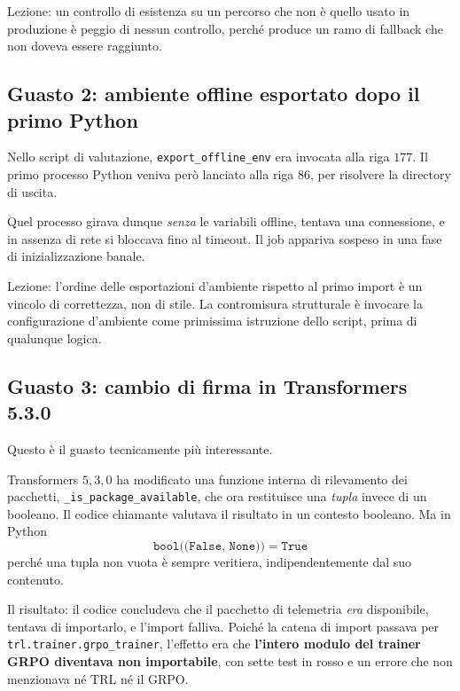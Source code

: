 Lezione: un controllo di esistenza su un percorso che non è quello usato in
produzione è peggio di nessun controllo, perché produce un ramo di fallback che
non doveva essere raggiunto.

\subsection{Guasto 2: ambiente offline esportato dopo il primo Python}
\label{sec:bug-offline-order}

Nello script di valutazione, \texttt{export\_offline\_env} era invocata alla riga
$177$. Il primo processo Python veniva però lanciato alla riga $86$, per
risolvere la directory di uscita.

Quel processo girava dunque \emph{senza} le variabili offline, tentava una
connessione, e in assenza di rete si bloccava fino al timeout. Il job appariva
sospeso in una fase di inizializzazione banale.

Lezione: l'ordine delle esportazioni d'ambiente rispetto al primo import è un
vincolo di correttezza, non di stile. La contromisura strutturale è invocare la
configurazione d'ambiente come primissima istruzione dello script, prima di
qualunque logica.

\subsection{Guasto 3: cambio di firma in Transformers 5.3.0}
\label{sec:bug-weave}

Questo è il guasto tecnicamente più interessante.

Transformers $5{,}3{,}0$ ha modificato una funzione interna di rilevamento dei
pacchetti, \texttt{\_is\_package\_available}, che ora restituisce una
\emph{tupla} invece di un booleano. Il codice chiamante valutava il risultato in
un contesto booleano. Ma in Python
\begin{equation}
  \texttt{bool((False, None))} \;=\; \texttt{True}
\end{equation}
perché una tupla non vuota è sempre veritiera, indipendentemente dal suo
contenuto.

Il risultato: il codice concludeva che il pacchetto di telemetria \emph{era}
disponibile, tentava di importarlo, e l'import falliva. Poiché la catena di
import passava per \texttt{trl.trainer.grpo\_trainer}, l'effetto era che
\textbf{l'intero modulo del trainer GRPO diventava non importabile}, con sette
test in rosso e un errore che non menzionava né TRL né il GRPO.

